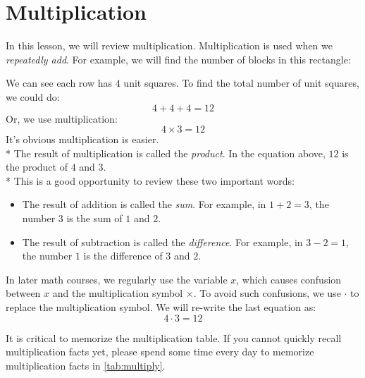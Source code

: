 
\section{Multiplication}

In this lesson, we will review multiplication. Multiplication is used when we \textit{repeatedly add}.
For example, we will find the number of blocks in this rectangle:
\\[0.1in]
\begin{tightcenter}
\end{tightcenter}

We can see each row has $4$ unit squares. To find the total number of unit squares, we could do:
\[
   4+4+4=12
\]
Or, we use multiplication:
\[
   4 \times 3 = 12
\]
It's obvious multiplication is easier.\\*
The result of multiplication is called the \textit{product}. In the equation above, $12$ is the product of $4$ and $3$.\\*
This is a good opportunity to review these two important words:
\begin{itemize}
\item The result of addition is called the \textit{sum}. For example, in $1+2=3$, the number $3$ is the sum of $1$ and $2$.
\item The result of subtraction is called the \textit{difference}. For example, in $3-2=1$, the number $1$ is the difference of $3$ and $2$.
\end{itemize}
In later math courses, we regularly use the variable $x$, which causes confusion between $x$ and the multiplication symbol $\times$. To avoid such confusions, we use $\cdot$ to replace the multiplication symbol. We will re-write the last equation as:
\[
   4 \cdot 3 = 12
\]

It is critical to memorize the multiplication table. If you cannot quickly recall multiplication facts yet, please spend some time every day to memorize multiplication facts in \cref{tab:multiply}.

